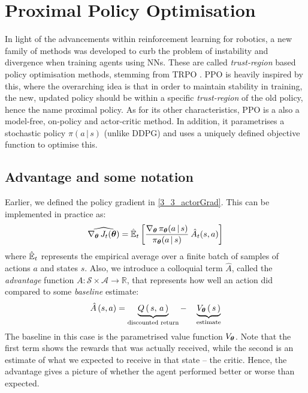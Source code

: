 \section{Proximal Policy Optimisation}
\label{sec:PPO}

In light of the advancements within reinforcement learning for robotics, a new family of methods was developed to curb the problem of instability and divergence when training agents using NNs. These are called \textit{trust-region} based policy optimisation methods, stemming from TRPO \cite{TRPO}.
PPO \cite{PPO} is heavily inspired by this, where the overarching idea is that in order to maintain stability in training, the new, updated policy should be within a specific \textit{trust-region} of the old policy, hence the name proximal policy.
As for its other characteristics, PPO is a also a model-free, on-policy and actor-critic method. In addition, it parametrises a stochastic policy $\pi(a\,|\,s)$ (unlike DDPG) and uses a uniquely defined objective function to optimise this.

\subsection{Advantage and some notation}
Earlier, we defined the policy gradient in \eqref{3_3_actorGrad}. This can be implemented in practice as:
\begin{equation}
    \widehat{\nabla_{\boldsymbol{\theta}} \, J_t(\boldsymbol{\theta})} = \hat{\mathbb{E}}_t \left[ 
    \frac{\nabla_{\boldsymbol{\theta}} \, \pi_{\boldsymbol{\theta}} (a \, | \, s)}{\pi_{\boldsymbol{\theta}} (a \, | \, s)} \: \hat{A}_t (s, a) 
    \right] \label{3_5_actorGrad}
\end{equation}
where $\hat{\mathbb{E}}_t$ represents the empirical average over a finite batch of samples of actions $a$ and states $s$. Also, we introduce a colloquial term $\hat{A}$, called the \textit{advantage} function $A : \mathcal{S} \times \mathcal{A} \rightarrow \mathbb{R}$, that represents how well an action did compared to some \textit{baseline} estimate:
\begin{equation}
    \hat{A}\,(s ,a) = \underbrace{Q\, (\,s,\, a\,)}_{\text{discounted return}} - \quad \underbrace{V_{\boldsymbol{\theta}}\,(\,s\,)}_{\text{estimate}} \label{3_5_advantage}
\end{equation}
The baseline in this case is the parametrised value function $V_{\boldsymbol{\theta}}$. Note that the first term shows the rewards that was actually received, while the second is an estimate of what we expected to receive in that state -- the critic. Hence, the advantage gives a picture of whether the agent performed better or worse than expected. 

